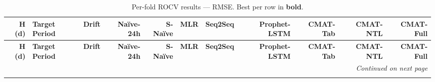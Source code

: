 \begingroup\small\setlength{\tabcolsep}{2pt}\renewcommand{\arraystretch}{1.2}
\begin{longtable}{r l r r r r r r r r r}
\caption{Per-fold ROCV results --- RMSE. Best per row in \textbf{bold}.}
\label{tab:baseline_rmse} \\

\toprule
\textbf{H (d)} & \textbf{Target Period} & \textbf{Drift} & \textbf{Na\"ive-24h} & \textbf{S-Na\"ive} & \textbf{MLR} & \textbf{Seq2Seq} & \textbf{Prophet-LSTM} & \textbf{CMAT-Tab} & \textbf{CMAT-NTL} & \textbf{CMAT-Full} \\
\midrule
\endfirsthead

\toprule
\textbf{H (d)} & \textbf{Target Period} & \textbf{Drift} & \textbf{Na\"ive-24h} & \textbf{S-Na\"ive} & \textbf{MLR} & \textbf{Seq2Seq} & \textbf{Prophet-LSTM} & \textbf{CMAT-Tab} & \textbf{CMAT-NTL} & \textbf{CMAT-Full} \\
\midrule
\endhead

\midrule
\multicolumn{11}{r}{\textit{Continued on next page}} \\
\endfoot

\bottomrule
\endlastfoot


\end{longtable}
